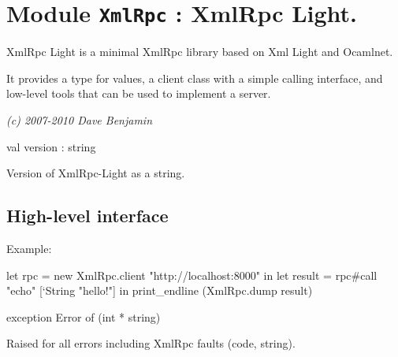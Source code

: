 \documentclass[11pt]{article}
\begin{document}
\tableofcontents
\section{Module {\tt{XmlRpc}} : XmlRpc Light.}
\label{module:XmlRpc}



    XmlRpc Light is a minimal XmlRpc library based on Xml Light and Ocamlnet.


    It provides a type for values, a client class with a simple calling
    interface, and low-level tools that can be used to implement a server.


    {\it (c) 2007-2010 Dave Benjamin}



\ocamldocvspace{0.5cm}



\label{val:XmlRpc.version}\begin{ocamldoccode}
val version : string
\end{ocamldoccode}
\begin{ocamldocdescription}
Version of XmlRpc-Light as a string.


\end{ocamldocdescription}




\subsection{High-level interface}




Example: \begin{ocamldoccode}

    let rpc = new XmlRpc.client "http://localhost:8000" in
    let result = rpc#call "echo" [`String "hello!"] in
    print_endline (XmlRpc.dump result) 
\end{ocamldoccode}




\label{exception:XmlRpc.Error}\begin{ocamldoccode}
exception Error of (int * string)
\end{ocamldoccode}
\begin{ocamldocdescription}
Raised for all errors including XmlRpc faults (code, string).


\end{ocamldocdescription}
\end{document}
